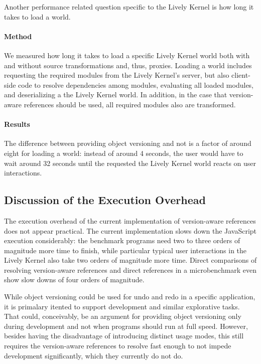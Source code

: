Another performance related question specific to the Lively Kernel is how long it takes to load a world.

\paragraph{Method}
We measured how long it takes to load a specific Lively Kernel world both with and without source transformations and, thus, proxies.
Loading a world includes requesting the required modules from the Lively Kernel's server, but also client-side code to resolve dependencies among modules, evaluating all loaded modules, and deserializing a the Lively Kernel world.
In addition, in the case that version-aware references should be used, all required modules also are transformed.

\paragraph{Results}
The difference between providing object versioning and not is a factor of around eight for loading a world: instead of around 4 seconds, the user would have to wait around 32 seconds until the requested the Lively Kernel world reacts on user interactions.




\subsection{Discussion of the Execution Overhead}

The execution overhead of the current implementation of version-aware references does not appear practical.
The current implementation slows down the JavaScript execution considerably: the benchmark programs need two to three orders of magnitude more time to finish, while particular typical user interactions in the Lively Kernel also take two orders of magnitude more time.
Direct comparisons of resolving version-aware references and direct references in a microbenchmark even show slow downs of four orders of magnitude.

While object versioning could be used for undo and redo in a specific application, it is primalary itented to support development and similar explorative tasks.
That could, conceivably, be an argument for providing object versioning only during development and not when programs should run at full speed.
However, besides having the disadvantage of introducing distinct usage modes, this still requires the version-aware references to resolve fast enough to not impede development significantly, which they currently do not do.

